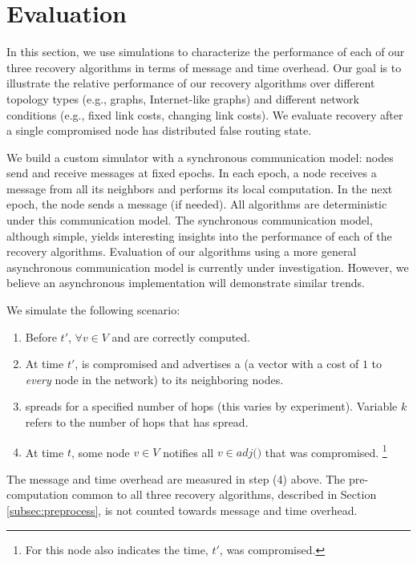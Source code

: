 \section{Evaluation}
\label{sec:eval}

In this section, we use simulations to characterize the performance of each of our three recovery algorithms in terms of message and time overhead. 
Our goal is to illustrate the relative performance of our recovery algorithms over different topology types (e.g., \er graphs, Internet-like graphs) and
different network conditions (e.g., fixed link costs, changing link costs).
We evaluate recovery after a single compromised node has distributed false routing state.

We build a custom simulator with a synchronous communication model: nodes send and receive messages at fixed epochs.  In each epoch, a node receives a
message from all its neighbors and performs its local computation.  In
the next epoch, the node sends a message (if needed).   All algorithms
are deterministic under this communication model.
The synchronous communication model, although simple, yields
interesting insights into the performance of each of the recovery
algorithms. Evaluation of our algorithms using a more general
asynchronous communication model is currently under
investigation. However, we believe an asynchronous implementation
will demonstrate similar trends.  

We simulate the following scenario:

\begin{enumerate}
	\item Before $t'$, $\forall v \in V$ \minvv and \dmatrixv are correctly computed.

	\item At time $t'$, \bad is compromised and advertises a \badvector (a vector with a cost of $1$ to \emph{every} node in the network) to its neighboring nodes.

	\item \badvector spreads for a specified number of hops (this varies by experiment).  Variable $k$ refers to the number of hops that \badvector has spread.

	\item At time $t$, some node $v \in V$ notifies all $v \in adj($\bads$)$ that \bad was compromised. 
	{\footnote { \small For \cpr this node also indicates the time, $t'$, \bad was compromised.}} 

\end{enumerate}
The message and time overhead are measured in step (4) above. The pre-computation common to all three recovery algorithms, described in Section \ref{subsec:preprocess},
is not counted towards message and time overhead.


